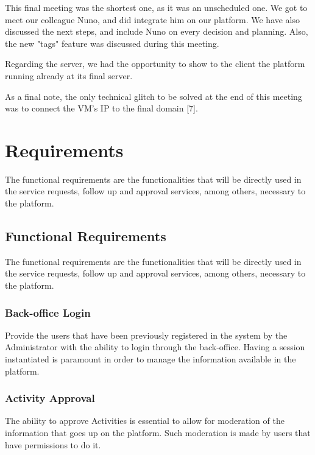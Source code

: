 \documentclass[a4paper,12pt,journal,twoside,compsoc]{PPIEEEtran}
\begin{document}
This final meeting was the shortest one, as it was an unscheduled one. We got to meet our colleague Nuno, and did integrate him on our platform. We have also discussed the next steps, and include Nuno on every decision and planning. Also, the new "tags" feature was discussed during this meeting.

Regarding the server, we had the opportunity to show to the client the platform running already at its final server.

As a final note, the only technical glitch to be solved at the end of this meeting was to connect the VM's IP to the final domain [7].


\section{Requirements}

The functional requirements are the functionalities that will be directly used in the service requests, follow up and approval services, among others, necessary to the platform.

\subsection{Functional Requirements}

The functional requirements are the functionalities that will be directly used in the service requests, follow up and approval services, among others, necessary to the platform.

\subsubsection{Back-office Login}

Provide the users that have been previously registered in the system by the Administrator with the ability to login through the back-office. Having a session instantiated is paramount in order to manage the information available in the platform.

\subsubsection{Activity Approval}

The ability to approve Activities is essential to allow for moderation of the information that goes up on the platform. Such moderation is made by users that have permissions to do it.
\end{document}
